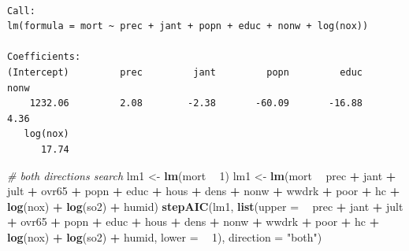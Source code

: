 \documentclass[
]{book}
\newenvironment{Shaded}{\begin{snugshade}}{\end{snugshade}}
\newcommand{\CommentTok}[1]{\textcolor[rgb]{0.56,0.35,0.01}{\textit{#1}}}
\newcommand{\DataTypeTok}[1]{\textcolor[rgb]{0.13,0.29,0.53}{#1}}
\newcommand{\DecValTok}[1]{\textcolor[rgb]{0.00,0.00,0.81}{#1}}
\newcommand{\KeywordTok}[1]{\textcolor[rgb]{0.13,0.29,0.53}{\textbf{#1}}}
\newcommand{\NormalTok}[1]{#1}
\newcommand{\OperatorTok}[1]{\textcolor[rgb]{0.81,0.36,0.00}{\textbf{#1}}}
\newcommand{\StringTok}[1]{\textcolor[rgb]{0.31,0.60,0.02}{#1}}
\begin{document}
\begin{verbatim}

Call:
lm(formula = mort ~ prec + jant + popn + educ + nonw + log(nox))

Coefficients:
(Intercept)         prec         jant         popn         educ         nonw  
    1232.06         2.08        -2.38       -60.09       -16.88         4.36  
   log(nox)  
      17.74  
\end{verbatim}

\begin{Shaded}
\begin{Highlighting}[]
\CommentTok{# both directions search}
\NormalTok{lm1 <-}\StringTok{ }\KeywordTok{lm}\NormalTok{(mort }\OperatorTok{~}\StringTok{ }\DecValTok{1}\NormalTok{)}
\NormalTok{lm1 <-}\StringTok{ }\KeywordTok{lm}\NormalTok{(mort }\OperatorTok{~}\StringTok{ }\NormalTok{prec }\OperatorTok{+}\StringTok{ }\NormalTok{jant }\OperatorTok{+}\StringTok{ }\NormalTok{jult }\OperatorTok{+}\StringTok{ }\NormalTok{ovr65 }\OperatorTok{+}\StringTok{ }\NormalTok{popn }\OperatorTok{+}\StringTok{ }\NormalTok{educ }\OperatorTok{+}\StringTok{ }\NormalTok{hous }\OperatorTok{+}\StringTok{ }\NormalTok{dens }\OperatorTok{+}\StringTok{ }\NormalTok{nonw }\OperatorTok{+}
\NormalTok{		 wwdrk }\OperatorTok{+}\StringTok{ }\NormalTok{poor }\OperatorTok{+}\StringTok{ }\NormalTok{hc }\OperatorTok{+}\StringTok{ }\KeywordTok{log}\NormalTok{(nox) }\OperatorTok{+}\StringTok{ }\KeywordTok{log}\NormalTok{(so2) }\OperatorTok{+}\StringTok{ }\NormalTok{humid)}
\KeywordTok{stepAIC}\NormalTok{(lm1, }\KeywordTok{list}\NormalTok{(}\DataTypeTok{upper =} \OperatorTok{~}\StringTok{ }\NormalTok{prec }\OperatorTok{+}\StringTok{ }\NormalTok{jant }\OperatorTok{+}\StringTok{ }\NormalTok{jult }\OperatorTok{+}\StringTok{ }\NormalTok{ovr65 }\OperatorTok{+}\StringTok{ }\NormalTok{popn }\OperatorTok{+}\StringTok{ }\NormalTok{educ }\OperatorTok{+}\StringTok{ }\NormalTok{hous }\OperatorTok{+}\StringTok{ }\NormalTok{dens }\OperatorTok{+}\StringTok{ }\NormalTok{nonw }\OperatorTok{+}\StringTok{ }\NormalTok{wwdrk }\OperatorTok{+}\StringTok{ }\NormalTok{poor }\OperatorTok{+}\StringTok{ }\NormalTok{hc }\OperatorTok{+}\StringTok{ }\KeywordTok{log}\NormalTok{(nox) }\OperatorTok{+}\StringTok{ }\KeywordTok{log}\NormalTok{(so2) }\OperatorTok{+}\StringTok{ }\NormalTok{humid, }\DataTypeTok{lower =} \OperatorTok{~}\StringTok{ }\DecValTok{1}\NormalTok{), }\DataTypeTok{direction =} \StringTok{"both"}\NormalTok{)}
\end{Highlighting}
\end{Shaded}
\end{document}
